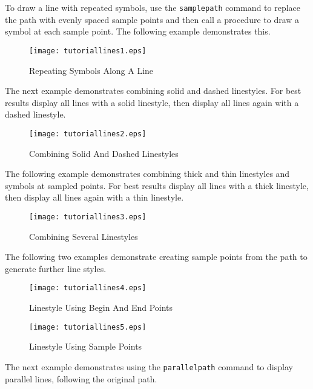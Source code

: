 To draw a line with repeated symbols, use the
\texttt{samplepath}
command to replace the path with evenly spaced sample points and
then call a procedure to draw a symbol at each sample point.
The following example demonstrates this.



\begin{figure}[htb]
\texttt{[image: tutoriallines1.eps]}
\caption{Repeating Symbols Along A Line}
\label{tutoriallines1}
\end{figure}

The next example demonstrates
combining solid and dashed linestyles.
For best results display all lines with a solid linestyle,
then display all lines again with a dashed linestyle.



\begin{figure}[htb]
\texttt{[image: tutoriallines2.eps]}
\caption{Combining Solid And Dashed Linestyles}
\label{tutoriallines2}
\end{figure}

The following example demonstrates combining thick and
thin linestyles and symbols at sampled points.
For best results display all lines with a thick linestyle,
then display all lines again with a thin linestyle.



\begin{figure}[htb]
\texttt{[image: tutoriallines3.eps]}
\caption{Combining Several Linestyles}
\label{tutoriallines3}
\end{figure}

The following two examples demonstrate creating sample points
from the path to generate further line styles.



\begin{figure}[htb]
\texttt{[image: tutoriallines4.eps]}
\caption{Linestyle Using Begin And End Points}
\label{tutoriallines4}
\end{figure}



\begin{figure}[htb]
\texttt{[image: tutoriallines5.eps]}
\caption{Linestyle Using Sample Points}
\label{tutoriallines5}
\end{figure}

The next example demonstrates using the \texttt{parallelpath}
command to display parallel lines, following the original path.

